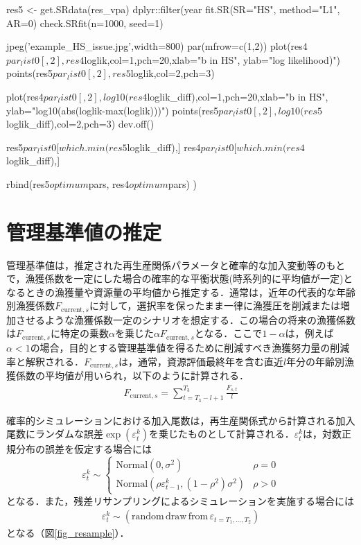 \documentclass[11pt]{jsarticle}
\begin{document}
res5 <- get.SRdata(res_vpa) %
   dplyr::filter(year%
    fit.SR(SR="HS", method="L1", AR=0) %
    check.SRfit(n=1000, seed=1)

  jpeg('example_HS_issue.jpg',width=800)
  par(mfrow=c(1,2))
  plot(res4$par_list0[,2],res4$loglik,col=1,pch=20,xlab="b in HS", ylab="log likelihood)")
  points(res5$par_list0[,2],res5$loglik,col=2,pch=3)
  
  plot(res4$par_list0[,2],log10(res4$loglik_diff),col=1,pch=20,xlab="b in HS", ylab="log10(abs(loglik-max(loglik)))")
  points(res5$par_list0[,2],log10(res5$loglik_diff),col=2,pch=3)    
  dev.off()
  
  res5$par_list0[which.min(res5$loglik_diff),]
  res4$par_list0[which.min(res4$loglik_diff),]
  
  rbind(res5$optimum$pars,
        res4$optimum$pars)
)\fi

\section{管理基準値の推定}
管理基準値は，推定された再生産関係パラメータと確率的な加入変動等のもとで，漁獲係数を一定にした場合の確率的な平衡状態(時系列的に平均値が一定)となるときの漁獲量や資源量の平均値から推定する．通常は，近年の代表的な年齢別漁獲係数$F_{\mathrm{current},s}$に対して，選択率を保ったまま一律に漁獲圧を削減または増加させるような漁獲係数一定のシナリオを想定する．この場合の将来の漁獲係数は$F_{\mathrm{current},s}$に特定の乗数$\alpha$を乗じた$\alpha F_{\mathrm{current},s}$となる．ここで$1-\alpha$は，例えば$\alpha<1$の場合，目的とする管理基準値を得るために削減すべき漁獲努力量の削減率と解釈される．$F_{\mathrm{current},s}$は，通常，資源評価最終年を含む直近$l$年分の年齢別漁獲係数の平均値が用いられ，以下のように計算される．
\begin{eqnarray}
  F_{\mathrm{current},s} = \sum_{t=T_3-l+1}^{T_3}\frac{F_{s,t}}{l}
\end{eqnarray}

確率的シミュレーションにおける加入尾数は，再生産関係式から計算される加入尾数にランダムな誤差$\exp (\varepsilon_t^k)$を乗じたものとして計算される．$\varepsilon_t^k$は，対数正規分布の誤差を仮定する場合には
\begin{equation}
  \varepsilon_t^k \sim \begin{cases}
    \mathrm{Normal} (0,\sigma^2 ) & \rho=0 \\
    \mathrm{Normal} (\rho \varepsilon_{t-1}^k,(1-\rho^2) \sigma^2) & \rho>0
  \end{cases}
  \label{epsilon1}
\end{equation}
となる．また，残差リサンプリングによるシミュレーションを実施する場合には
\begin{eqnarray}
  \varepsilon_t^k \sim (\mathrm{random} \, \mathrm{draw} \, \mathrm{from} \, \varepsilon_{t={T_1,…,T_2}})
  \label{epsilon2}  
\end{eqnarray}
となる（図\ref{fig_resample}）．
\end{document}
